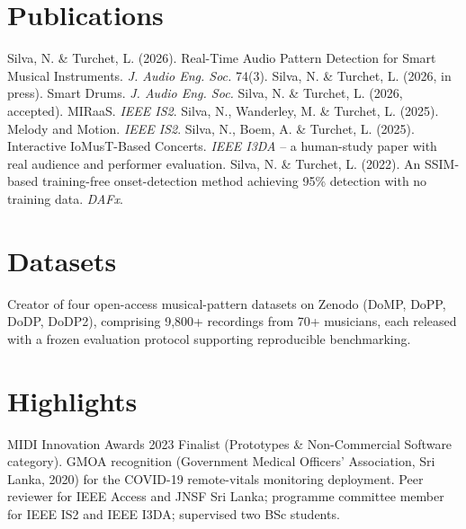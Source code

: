 \documentclass[11pt]{article}
\begin{document}
\section*{Publications}
Silva, N. \& Turchet, L. (2026). Real-Time Audio Pattern Detection for Smart Musical Instruments. \textit{J. Audio Eng. Soc.} 74(3). Silva, N. \& Turchet, L. (2026, in press). Smart Drums. \textit{J. Audio Eng. Soc.} Silva, N. \& Turchet, L. (2026, accepted). MIRaaS. \textit{IEEE IS2}. Silva, N., Wanderley, M. \& Turchet, L. (2025). Melody and Motion. \textit{IEEE IS2}. Silva, N., Boem, A. \& Turchet, L. (2025). Interactive IoMusT-Based Concerts. \textit{IEEE I3DA} -- a human-study paper with real audience and performer evaluation. Silva, N. \& Turchet, L. (2022). An SSIM-based training-free onset-detection method achieving 95\% detection with no training data. \textit{DAFx}.

\section*{Datasets}
Creator of four open-access musical-pattern datasets on Zenodo (DoMP, DoPP, DoDP, DoDP2), comprising 9,800+ recordings from 70+ musicians, each released with a frozen evaluation protocol supporting reproducible benchmarking.

\section*{Highlights}
MIDI Innovation Awards 2023 Finalist (Prototypes \& Non-Commercial Software category). GMOA recognition (Government Medical Officers' Association, Sri Lanka, 2020) for the COVID-19 remote-vitals monitoring deployment. Peer reviewer for IEEE Access and JNSF Sri Lanka; programme committee member for IEEE IS2 and IEEE I3DA; supervised two BSc students.
\end{document}
